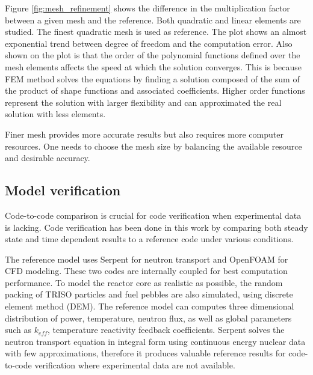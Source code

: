 \documentclass{elsarticle}
\begin{document}
Figure \ref{fig:mesh_refinement} shows the difference in the multiplication factor between a given mesh and the reference. Both quadratic and linear elements are studied. The finest quadratic mesh is used as reference. The plot shows an almost exponential trend between degree of freedom and the computation error. 
Also shown on the plot is that the order of the polynomial functions defined over the mesh elements affects the speed at which the solution converges. This is because FEM method solves the equations by finding a solution composed of the sum of the product of shape functions and associated coefficients. Higher order functions represent the solution with larger flexibility and can approximated the real solution with less elements. 
 
Finer mesh provides more accurate results but also requires more computer resources. One needs to choose the mesh size by balancing the available resource and desirable accuracy. 




\subsection{Model verification}
Code-to-code comparison is crucial for code verification when experimental data is lacking. Code verification has been done in this work by comparing both steady state and time dependent results to a reference code under various conditions. 

The reference model \cite{Aufiero2016} uses Serpent for neutron transport and OpenFOAM for CFD modeling. These two codes are internally coupled for best computation performance. To model the reactor core as realistic as possible, the random packing of TRISO particles and fuel pebbles are also simulated, using discrete element method (DEM). The reference model can computes three dimensional distribution of power, temperature, neutron flux, as well as global parameters such as $k_{eff}$, temperature reactivity feedback coefficients. 
Serpent solves the neutron transport equation in integral form using continuous energy nuclear data with few approximations, therefore it produces valuable reference results for code-to-code verification where experimental data are not available. 
\end{document}
